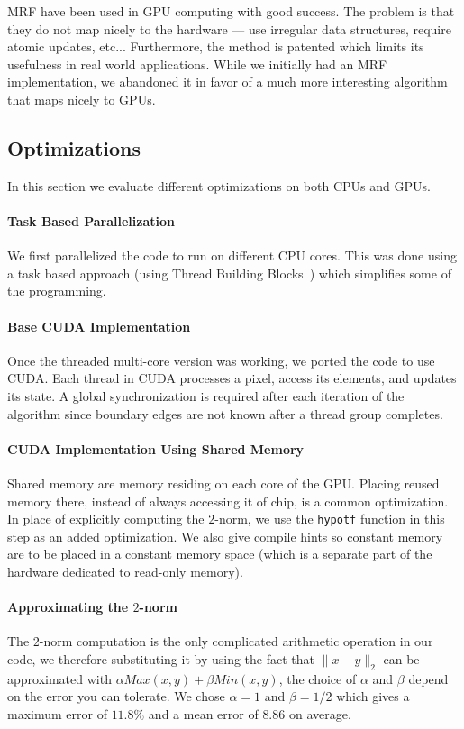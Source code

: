 \documentclass[
10pt, %
letterpaper, %
oneside, %
headinclude,footinclude, %
BCOR5mm, %
]{scrartcl}
\newcommand{\fix}[1]{\texttt{\small #1}}
\begin{document}
MRF have been used in GPU computing with good success.
The problem is that they do not map nicely to the hardware --- use
  irregular data structures, require atomic updates, etc...
Furthermore, the method is patented which limits its usefulness in 
  real world applications.
While we initially had an MRF implementation, we abandoned it
  in favor of a much more interesting algorithm that maps nicely to
  GPUs.

\subsection{Optimizations}

In this section we evaluate different optimizations on both CPUs and GPUs.


\paragraph{Task Based Parallelization}
We first parallelized the code to run on different CPU cores.
This was done using a task based approach (using Thread Building Blocks~\cite{reinders2007intel}) 
  which simplifies some of the programming.

\paragraph{Base CUDA Implementation}
Once the threaded multi-core version was working, we ported the code to use CUDA. 
Each thread in CUDA processes a pixel, access its elements, and updates its state.
A global synchronization is required after each iteration of the algorithm since boundary edges are not known after a thread group completes.

\paragraph{CUDA Implementation Using Shared Memory}
Shared memory are memory residing on each core of the GPU. Placing reused memory there, instead of always accessing it of chip, is a common optimization.
In place of explicitly computing the $2$-norm, we use the \fix{hypotf} function in this step as an added optimization.
We also give compile hints so constant memory are to be placed in a constant memory space (which is a separate part of the hardware dedicated to read-only memory).

\paragraph{Approximating the $2$-norm}
The $2$-norm computation is the only complicated arithmetic operation in our code, we therefore substituting it by using the fact that $\|x-y\|_2$ can be approximated
with $\alpha Max(x,y) + \beta Min(x,y)$, the choice of $\alpha$ and $\beta$ depend on the error you can tolerate. We chose $\alpha = 1$ and $\beta = 1/2$ which gives
a maximum error of $11.8\%$ and a mean error of $8.86$ on average.
\end{document}
